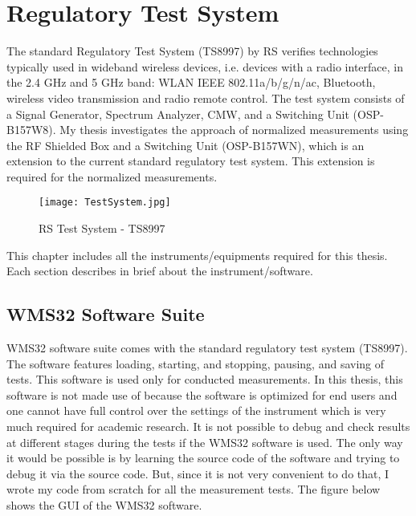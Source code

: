 \chapter{Regulatory Test System}  \label{chap:3}

The standard Regulatory Test System (TS8997) by \acs{RS}\textregistered{} verifies technologies typically used in wideband wireless devices, i.e. devices with a radio interface, in the 2.4 GHz and 5 GHz band: \acs{WLAN} \acs{IEEE} 802.11a/b/g/n/ac, Bluetooth\textregistered, wireless video transmission and radio remote control. %
The test system consists of a Signal Generator, Spectrum Analyzer,  \acf{CMW}, and a Switching Unit (\acs{OSP}-B157W8). My thesis investigates the approach of normalized measurements using the \acs{RF} Shielded Box and a Switching Unit (OSP-B157WN), which is an extension to the current standard regulatory test system. This extension is required for the normalized measurements.

\begin{figure}[H]
\centering
\texttt{[image: TestSystem.jpg]}
\caption{\acs{RS}\textregistered{} Test System - TS8997 \cite{ts8997}}
\label{fig:testsystem}
\end{figure}

This chapter includes all the instruments/equipments required for this thesis. Each section describes in brief about the instrument/software.

\section{WMS32 Software Suite}
\label{sec:wms32}
WMS32 software suite comes with the standard regulatory test system (TS8997). The software features loading, starting, and stopping, pausing, and saving of tests. This software is used only for conducted measurements. In this thesis, this software is not made use of because the software is optimized for end users and one cannot have full control over the settings of the instrument which is very much required for academic research. It is not possible to debug and check results at different stages during the tests if the WMS32 software is used. The only way it would be possible is by learning the source code of the software and trying to debug it via the source code. But, since it is not very convenient to do that, I wrote my code from scratch for all the measurement tests. The figure below shows the \acs{GUI} of the WMS32 software.

